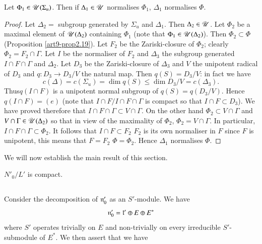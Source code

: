 \setcounter{definition}{23}
\begin{proposition}\label{art9-prop2.24}
Let $\Phi_1 \in \mathscr{U} (\Sigma_u)$. Then if $\Delta_1 \in \mathscr{U}$ normalises $\Phi_1$, $\Delta_1$ normalises $\Phi$.
\end{proposition}

\begin{proof}
Let $\Delta_2 =$ subgroup generated by $\Sigma_u$ and $\Delta_1$. Then $\Delta_2 \in \mathscr{U}$. Let $\Phi_2$ be a maximal element of $\mathscr{U} (\Delta_2)$ containing $\Phi_1$ (note that $\Phi_1 \in \mathscr{U}(\Delta_2)$). Then $\Phi_2 \subset \Phi$ (Proposition \ref{art9-prop2.19}). Let $F_2$ be the Zariski-closure of $\Phi_2$; clearly $\Phi_2 = F_2 \cap \Gamma$. Let $I$ be the normaliser of $F_2$ and $\Delta_3$ the subgroup generated $I \cap F \cap \Gamma$ and $\Delta_2$. Let $D_3$ be the Zariski-closure of $\Delta_3$ and $V$ the unipotent radical of $D_3$ and $q : D_3 \to D_3 / V$ the natural map. Then $q (S) = D_3 / V$: in fact we have
$$
c(\Delta) = c (\Sigma_u) = \dim q (S) \leqslant \dim D_3 / V = c (\Delta_3).
$$
Thus\pageoriginale  $q(I \cap F)$ is a unipotent normal subgroup of $q(S) = q (D_3/ V)$. Hence $q(I \cap F) = (e)$ (note that $I \cap F/I \cap F \cap \Gamma$ is compact so that $I \cap F \subset D_3$). We have proved therefore that $I \cap F \cap \Gamma \subset V \cap \Gamma$. On the other hand $\Phi_2 \subset V \cap \Gamma$ and $V \cap \Gamma \in \mathscr{U} (\Delta_2)$ so that in view of the maximality of $\Phi_2$, $\Phi_2 = V \cap \Gamma$. In particular, $I \cap F \cap \Gamma \subset \Phi_2$. It follows that $I \cap F \subset F_2$ \ie $F_2$ is its own normaliser in $F$ since $F$ is unipotent, this means that $F = F_2$ \ie $\Phi = \Phi_2$. Hence $\Delta_1$ normalises $\Phi$.
\end{proof}

We will now establish the main result of this section.

\begin{theorem}\label{art9-thm2.25}
$N'_0/L'$ is compact.
\end{theorem}

\setcounter{subsection}{25}
\subsection{}\label{art9-subsec2.26}
Consider the decomposition of $\mathfrak{n}'_0$ as an $S'$-module. We have
$$
\mathfrak{n}'_0 = \mathfrak{l}' \oplus E \oplus E^\ast
$$
where $S'$ operates trivially on $E$ and non-trivially on every irreducible $S'$-submodule of $E^\ast$. We then assert that we have

